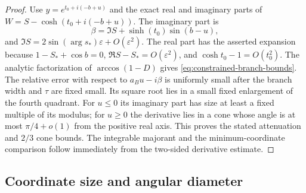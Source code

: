 \documentclass[11pt]{article}
\numberwithin{equation}{section}
\theoremstyle{remark}\newtheorem{remark}[theorem]{Remark}
\begin{document}
\begin{proof}
Use $y=e^{t_0+i(-b+u)}$ and the exact real and imaginary parts of
$W=S-\cosh(t_0+i(-b+u))$.  The imaginary part is
\[
 \beta=\Im S+\sinh(t_0)\sin(b-u),
\]
and $\Im S=2\sin(\arg s_*)\varepsilon+O(\varepsilon^2)$.
The real part has the asserted expansion because
$1-S_*+\cos b=0$, $\Re S-S_*=O(\varepsilon^2)$, and
$\cosh t_0-1=O(t_0^2)$.  The analytic factorization of
$\arccos(1-D)$ gives \eqref{eq:constrained-branch-bounds}.
The relative error with respect to $a_Bu-i\beta$ is uniformly
small after the branch width and $\tau$ are fixed small.  Its
square root lies in a small fixed enlargement of the fourth quadrant.
For $u\le0$
its imaginary part has size at least a fixed multiple of its modulus;
for $u\ge0$ the derivative lies in a cone whose angle is at most
$\pi/4+o(1)$ from the positive real axis.  This proves the stated
attenuation and $2/3$ cone bounds.  The integrable majorant and the
minimum-coordinate comparison follow immediately from the two-sided
derivative estimate.

\end{proof}

\subsection{Coordinate size and angular diameter}
\end{document}
